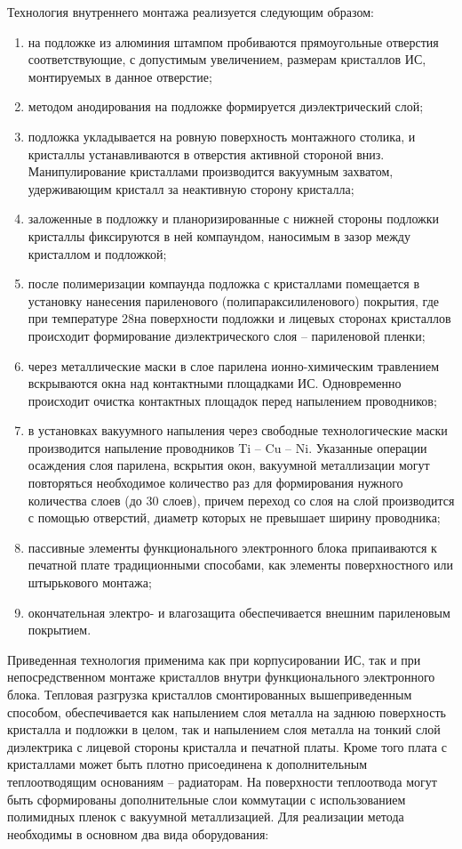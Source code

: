 \documentclass[unicode, 12pt, a4paper, oneside]{article}
\begin{document}
Технология внутреннего монтажа реализуется следующим образом:

\begin{enumerate}
\item на подложке из алюминия штампом пробиваются прямоугольные отверстия соответствующие, с допустимым увеличением, размерам кристаллов ИС, монтируемых в данное отверстие;
\item методом анодирования на подложке формируется диэлектрический слой;
\item подложка укладывается на ровную поверхность монтажного столика, и кристаллы устанавливаются в отверстия активной стороной вниз. Манипулирование кристаллами производится вакуумным захватом, удерживающим кристалл за неактивную сторону кристалла; 
\item заложенные в подложку и планоризированные с нижней стороны подложки кристаллы фиксируются в ней компаундом, наносимым в зазор между кристаллом и подложкой;
\item после полимеризации компаунда подложка с кристаллами помещается в установку нанесения париленового (полипараксилиленового) покрытия, где при температуре 28\textcelsius на поверхности подложки и лицевых сторонах кристаллов происходит формирование диэлектрического слоя – париленовой пленки; 
\item через металлические маски в слое парилена ионно-химическим травлением вскрываются окна над контактными площадками ИС. Одновременно происходит очистка контактных площадок перед напылением проводников; 
\item в установках вакуумного напыления через свободные технологические маски производится напыление проводников Ti – Cu – Ni.
Указанные операции осаждения слоя парилена, вскрытия окон, вакуумной металлизации могут повторяться необходимое количество раз для формирования нужного количества слоев (до 30 слоев), причем переход со слоя на слой производится с помощью отверстий, диаметр которых не превышает ширину проводника;
\item пассивные элементы функционального электронного блока припаиваются к печатной плате традиционными способами, как элементы поверхностного или штырькового монтажа;
\item окончательная электро- и влагозащита обеспечивается внешним париленовым покрытием.
\end{enumerate}
Приведенная технология применима как при корпусировании ИС, так и при непосредственном монтаже кристаллов внутри функционального электронного блока. Тепловая разгрузка кристаллов смонтированных вышеприведенным способом, обеспечивается как напылением слоя металла на заднюю поверхность кристалла и подложки в целом, так и напылением слоя металла на тонкий слой диэлектрика с лицевой стороны кристалла и печатной платы. Кроме того плата с кристаллами может быть плотно присоединена к дополнительным теплоотводящим основаниям – радиаторам. На поверхности теплоотвода могут быть сформированы дополнительные слои коммутации с использованием полимидных пленок с вакуумной металлизацией.
Для реализации метода необходимы в основном два вида оборудования:
\end{document}

